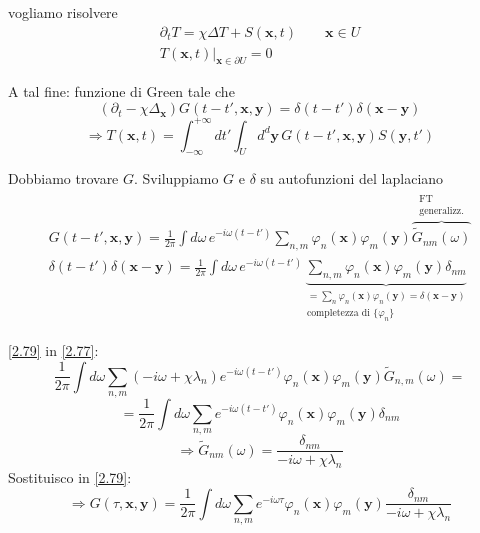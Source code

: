 \documentclass[a4paper,11pt]{report}
\newcommand{\x}{\boldsymbol{x}}
\newcommand{\y}{\boldsymbol{y}}
\begin{document}
vogliamo risolvere
\begin{equation}
\begin{gathered}
\partial_t T=\chi\Delta T + S(\x,t) \qquad \x \in U\\
T(\x,t)\big|_{\x\in \partial U}=0
\end{gathered}
\end{equation}

A tal fine: funzione di Green tale che 
\begin{equation}
(\partial_t - \chi \Delta_{\x})G(t-t',\x,\y)=\delta(t-t')\delta(\x-\y)
\label{2.77}
\end{equation}
\begin{equation}
\Rightarrow T(\x,t)=\int_{-\infty}^{+\infty}dt'\int_{U}d^d\y\, G(t-t',\x,\y)S(\y,t')
\label{2.78}
\end{equation}

Dobbiamo trovare $G$. Sviluppiamo $G$ e $\delta$ su autofunzioni del laplaciano
\begin{equation}
\begin{gathered}
G(t-t',\x,\y)=\frac{1}{2\pi}\int d\omega\, e^{-i\omega(t-t')} \sum_{n,m}\varphi_n (\x)\varphi_m(\y)\overbrace{\tilde{G}_{n m}(\omega)}^{\substack{\text{FT }\\\text{generalizz.}}} \\
\delta(t-t')\delta(\x-\y)=\frac{1}{2\pi}\int d\omega\, e^{-i\omega(t-t')} \underbrace{\sum_{n,m}\varphi_n(\x)\varphi_m(\y)\delta_{nm}}_{\substack{ =\sum_n\varphi_n(\x)\varphi_n(\y)=\delta(\x-\y)\\ \text{completezza di $\{\varphi_n\}$} }}
\end{gathered}
\label{2.79}
\end{equation}


\eqref{2.79} in \eqref{2.77}:
\[
\frac{1}{2\pi}\int d\omega \sum_{n,m}(-i\omega + \chi \lambda_n)e^{-i\omega(t-t')} \varphi_n(\x)\varphi_m(\y)\tilde{G}_{n,m}(\omega)=
\]
\[
=\frac{1}{2\pi}\int d\omega \sum_{n,m}e^{-i\omega(t-t')} \varphi_n(\x)\varphi_m(\y) \delta_{n m}
\]
\[
\Rightarrow \tilde{G}_{nm}(\omega)=\frac{\delta_{nm}}{-i\omega + \chi \lambda_n}
\]
Sostituisco in \eqref{2.79}:
\[
\Rightarrow G(\tau,\x,\y)=\frac{1}{2\pi}\int d\omega \sum_{n,m}e^{-i\omega \tau} \varphi_n(\x)\varphi_m(\y)\frac{\delta_{nm}}{-i\omega + \chi \lambda_n}
\]
\end{document}
